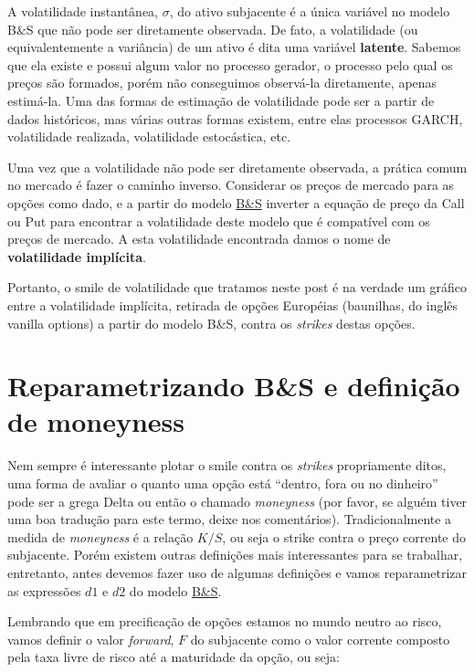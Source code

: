 \documentclass[]{book}
\begin{document}
A volatilidade instantânea, \(\sigma\), do ativo subjacente é a única
variável no modelo B\&S que não pode ser diretamente observada. De fato,
a volatilidade (ou equivalentemente a variância) de um ativo é dita uma
variável \textbf{latente}. Sabemos que ela existe e possui algum valor
no processo gerador, o processo pelo qual os preços são formados, porém
não conseguimos observá-la diretamente, apenas estimá-la. Uma das formas
de estimação de volatilidade pode ser a partir de dados históricos, mas
várias outras formas existem, entre elas processos GARCH, volatilidade
realizada, volatilidade estocástica, etc.

Uma vez que a volatilidade não pode ser diretamente observada, a prática
comum no mercado é fazer o caminho inverso. Considerar os preços de
mercado para as opções como dado, e a partir do modelo
\protect\hyperlink{bsm}{B\&S} inverter a equação de preço da Call ou Put
para encontrar a volatilidade deste modelo que é compatível com os
preços de mercado. A esta volatilidade encontrada damos o nome de
\textbf{volatilidade implícita}.

Portanto, o smile de volatilidade que tratamos neste post é na verdade
um gráfico entre a volatilidade implícita, retirada de opções Européias
(baunilhas, do inglês vanilla options) a partir do modelo B\&S, contra
os \emph{strikes} destas opções.

\section{Reparametrizando B\&S e definição de
moneyness}\label{reparametrizando}

Nem sempre é interessante plotar o smile contra os \emph{strikes}
propriamente ditos, uma forma de avaliar o quanto uma opção está
``dentro, fora ou no dinheiro'' pode ser a grega Delta ou então o
chamado \emph{moneyness} (por favor, se alguém tiver uma boa tradução
para este termo, deixe nos comentários). Tradicionalmente a medida de
\emph{moneyness} é a relação \(K/S\), ou seja o strike contra o preço
corrente do subjacente. Porém existem outras definições mais
interessantes para se trabalhar, entretanto, antes devemos fazer uso de
algumas definições e vamos reparametrizar as expressões \(d1\) e \(d2\)
do modelo \protect\hyperlink{bsm}{B\&S}.

Lembrando que em precificação de opções estamos no mundo neutro ao
risco, vamos definir o valor \emph{forward}, \(F\) do subjacente como o
valor corrente composto pela taxa livre de risco até a maturidade da
opção, ou seja:
\end{document}
